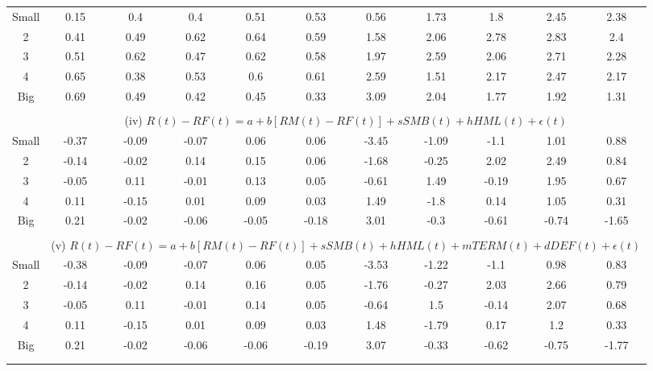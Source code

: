 \documentclass[11pt]{article}
\begin{document}
\begin{table}[H]
\begin{tabular}{ccccccccccc}
Small   & 0.15 & 0.4 & 0.4 & 0.51 & 0.53 & 0.56 & 1.73 & 1.8 & 2.45 & 2.38 \\
2   & 0.41 & 0.49 & 0.62 & 0.64 & 0.59 & 1.58 & 2.06 & 2.78 & 2.83 & 2.4 \\
3   & 0.51 & 0.62 & 0.47 & 0.62 & 0.58 & 1.97 & 2.59 & 2.06 & 2.71 & 2.28 \\
4   & 0.65 & 0.38 & 0.53 & 0.6 & 0.61 & 2.59 & 1.51 & 2.17 & 2.47 & 2.17 \\
Big   & 0.69 & 0.49 & 0.42 & 0.45 & 0.33 & 3.09 & 2.04 & 1.77 & 1.92 & 1.31 \\ \\

    &  \multicolumn{10}{c}{\small{(iv) $R(t)-RF(t) = a +b[RM(t)-RF(t)]+sSMB(t)+ hHML(t)+\epsilon(t)$}}\\


Small   & -0.37 & -0.09 & -0.07 & 0.06 & 0.06 &-3.45 & -1.09 & -1.1 & 1.01 & 0.88  \\
2   & -0.14 & -0.02 & 0.14 & 0.15 & 0.06 & -1.68 & -0.25 & 2.02 & 2.49 & 0.84 \\
3   & -0.05 & 0.11 & -0.01 & 0.13 & 0.05 & -0.61 & 1.49 & -0.19 & 1.95 & 0.67 \\
4   & 0.11 & -0.15 & 0.01 & 0.09 & 0.03 &1.49 & -1.8 & 0.14 & 1.05 & 0.31 \\
Big   & 0.21 & -0.02 & -0.06 & -0.05 & -0.18 & 3.01 & -0.3 & -0.61 & -0.74 & -1.65 \\ \\

    &  \multicolumn{10}{c}{\small{ (v) $R(t)-RF(t) = a +b[RM(t)-RF(t)]+sSMB(t)+ hHML(t)+mTERM(t)+dDEF(t)+\epsilon(t)$}}\\

Small   & -0.38 & -0.09 & -0.07 & 0.06 & 0.05 & -3.53 & -1.22 & -1.1& 0.98 & 0.83 \\
2   & -0.14 & -0.02 & 0.14 & 0.16 & 0.05 &-1.76 & -0.27 & 2.03 & 2.66 & 0.79  \\
3   & -0.05& 0.11 & -0.01 & 0.14 & 0.05 &-0.64 & 1.5 & -0.14 & 2.07 & 0.68  \\
4   & 0.11 & -0.15 & 0.01& 0.09 &0.03  & 1.48 & -1.79 & 0.17 & 1.2& 0.33 \\
Big   & 0.21 & -0.02 & -0.06 & -0.06 & -0.19 & 3.07 & -0.33 & -0.62 & -0.75 & -1.77 \\ \\

\hline \\
\end{tabular} 
\end{table}  
\end{document}

